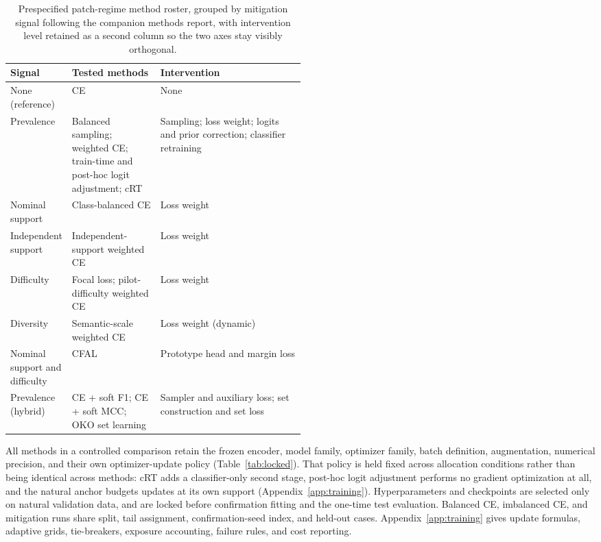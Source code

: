 \documentclass[11pt]{article}
\begin{document}
\begin{table}[H]
  \centering
  \scriptsize
  \begin{tabularx}{\linewidth}{@{}>{\raggedright\arraybackslash}p{0.20\linewidth}>{\raggedright\arraybackslash}p{0.30\linewidth}X@{}}
    \toprule
    Signal & Tested methods & Intervention \\
    \midrule
    None (reference) & CE & None \\
    Prevalence & Balanced sampling; weighted CE; train-time and post-hoc logit adjustment; cRT & Sampling; loss weight; logits and prior correction; classifier retraining \\
    Nominal support & Class-balanced CE & Loss weight \\
    Independent support & Independent-support weighted CE & Loss weight \\
    Difficulty & Focal loss; pilot-difficulty weighted CE & Loss weight \\
    Diversity & Semantic-scale weighted CE & Loss weight (dynamic) \\
    Nominal support and difficulty & CFAL & Prototype head and margin loss \\
    Prevalence (hybrid) & CE + soft F1; CE + soft MCC; OKO set learning & Sampler and auxiliary loss; set construction and set loss \\
    \bottomrule
  \end{tabularx}
  \caption{Prespecified patch-regime method roster, grouped by mitigation signal following the companion methods report, with intervention level retained as a second column so the two axes stay visibly orthogonal.}
  \label{tab:roster}
\end{table}

All methods in a controlled comparison retain the frozen encoder, model family, optimizer family, batch definition, augmentation, numerical precision, and their own optimizer-update policy (Table~\ref{tab:locked}). That policy is held fixed across allocation conditions rather than being identical across methods: cRT adds a classifier-only second stage, post-hoc logit adjustment performs no gradient optimization at all, and the natural anchor budgets updates at its own support (Appendix~\ref{app:training}). Hyperparameters and checkpoints are selected only on natural validation data, and are locked before confirmation fitting and the one-time test evaluation. Balanced CE, imbalanced CE, and mitigation runs share split, tail assignment, confirmation-seed index, and held-out cases. Appendix~\ref{app:training} gives update formulas, adaptive grids, tie-breakers, exposure accounting, failure rules, and cost reporting.
\end{document}

